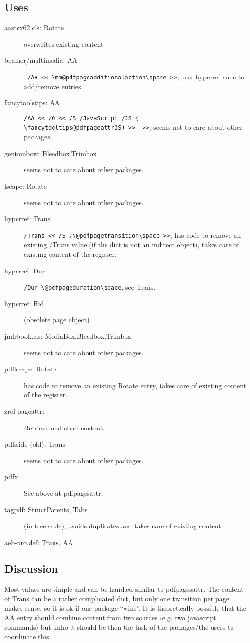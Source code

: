 \documentclass{article}
\begin{document}
\subsection{Uses}
\begin{description}
  \item[aastex62.cls: Rotate] overwrites existing content
  \item[beamer/multimedia: AA] \verb+ /AA << \mm@pdfpageadditionalaction\space >>+, uses hyperref code to add/remove entries.
  \item[fancytoolstips: AA] \verb+/AA << /O << /S /JavaScript /JS (    \fancytooltips@pdfpageattrJS) >>  >>+, seems not to care about other packages.

  \item[gentombow: Bleedbox,Trimbox] seems not to care about other packages.
  \item[lscape: Rotate] seems not to care about other packages.
  \item[hyperref: Trans] \verb+/Trans << /S /\@pdfpagetransition\space >>+, has code to remove an existing /Trans value (if the dict is not an indirect object), takes care of existing content of the register.

  \item[hyperref: Dur] \verb+/Dur \@pdfpageduration\space+, see Trans.
  \item[hyperref: Hid] (obsolete page object)
  \item[jmlrbook.cls: MediaBox,Bleedbox,Trimbox] seems not to care about other packages.
  \item[pdflscape: Rotate] has code to remove an existing Rotate entry, takes care of existing content of the register.
  \item[zref-pageattr:] Retrieve and store content.
  \item[pdfslide (old): Trans]  seems not to care about other packages.
  \item[pdfx] See above at pdfpagesattr.
  \item[tagpdf: StructParents, Tabs] (in tree code), avoids duplicates and takes care of existing content.
  \item[aeb-pro.def: Trans, AA]
\end{description}

\subsection{Discussion}

Most values are simple and can be handled similar to pdfpagesattr. The content of Trans can be a rather complicated dict, but only one transition per page makes sense, so it is ok if one package \enquote{wins}. It is theoretically possible that the AA entry should combine content from two sources (e.g. two javascript commands) but imho it should be then the task of the packages/the users to coordinate this.
\end{document}
